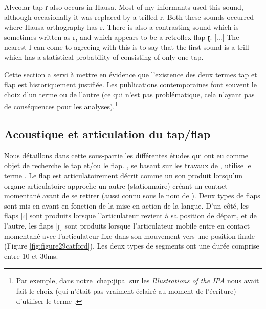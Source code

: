 \begin{displayquote}
Alveolar tap ɾ also occurs in Hausa. Most of my informants used this sound, although occasionally it was replaced by a trilled r. Both these sounds occurred where Hausa orthography has r. There is also a contrasting sound which is sometimes written as r, and which appears to be a retroflex flap ɽ. [...] The nearest I can come to agreeing with this is to say that the first sound is a trill which has a statistical probability of consisting of only one tap. \parencite[30]{ladefogedPhoneticStudyWest1968}
\end{displayquote}

Cette section a servi à mettre en évidence que l'existence des deux termes tap et flap est historiquement justifiée. Les publications contemporaines font souvent le choix d'un terme ou de l'autre (ce qui n'est pas problématique, cela n'ayant pas de conséquences pour les analyses).\footnote{Par exemple, dans notre \autoref{chap:jipa} sur les \textit{Illustrations of the IPA} nous avait fait le choix (qui n'était pas vraiment éclairé au moment de l'écriture) d'utiliser le terme .}

\subsection{Acoustique et articulation du tap/flap} \label{subsec:acous_tap_flap}

Nous détaillons dans cette sous-partie les différentes études qui ont eu comme objet de recherche le tap et/ou le flap.
\textcite[128]{catfordFundamentalProblemsPhonetics1977}, se basant sur les travaux de \textcite{ladefogedPhoneticStudyWest1968}, utilise le terme . Le flap est articulatoirement décrit comme un son produit lorsqu'un organe articulatoire approche un autre (stationnaire) créant un contact momentané avant de se retirer (aussi connu sous le nom de ). Deux types de flaps sont mis en avant en fonction de la mise en action de la langue. D'un côté, les flaps  [ɾ] sont produits lorsque l'articulateur revient à sa position de départ, et de l'autre, les flaps  [ɽ] sont produits lorsque l'articulateur mobile entre en contact momentané avec l'articulateur fixe dans son mouvement vers une position finale (Figure \ref{fig:figure29catford}). Les deux types de segments ont une durée comprise entre 10 et 30ms.\\


